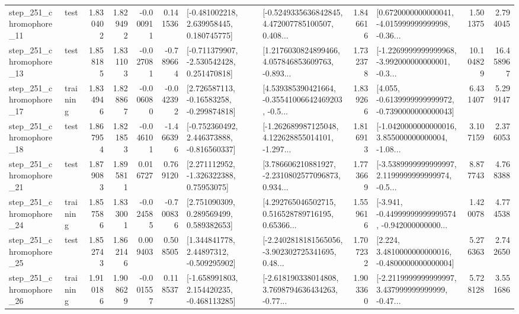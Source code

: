 \begin{tabular}{llrrrrllrlrr}
  step\_251\_chromophore\_11 &      test &      1.830402 &    1.829492 &     -0.000911 &  0.141536 &    [-0.481002218, 2.639958445, 0.180745775] &  [-0.5249335636842845, 4.472007785100507, 0.408... &       1.846616 &  [0.6720000000000041, -4.015999999999998, -0.36... &            1.501375 &          2.794045 \\
  step\_251\_chromophore\_13 &      test &      1.858185 &    1.831103 &     -0.027081 & -0.789664 &   [-0.711379907, -2.530542428, 0.251470818] &  [1.2176030824899466, 4.057846853609763, -0.893... &       1.732378 &  [-1.2269999999999968, -3.992000000000001, -0.3... &           10.104829 &         16.458967 \\
  step\_251\_chromophore\_17 &  training &      1.834946 &    1.828867 &     -0.006080 & -0.042392 &    [2.726587113, -0.16583258, -0.299874818] &  [4.539385390421664, -0.35541006642469203, -0.5... &       1.839266 &  [4.055, -0.6139999999999972, -0.7390000000000043] &            6.431407 &          5.299147 \\
  step\_251\_chromophore\_18 &      test &      1.867954 &    1.821853 &     -0.046101 & -1.466396 &   [-0.752360492, 2.446373888, -0.816560337] &  [-1.262689987125048, 4.122628855014101, -1.297... &       1.816913 &  [-1.0420000000000016, 3.855000000000004, -1.08... &            3.107159 &          2.376053 \\
  step\_251\_chromophore\_21 &      test &      1.879083 &    1.895811 &      0.016727 &  0.769120 &     [2.271112952, -1.326322388, 0.75953075] &  [3.786606210881927, -2.2310802577096873, 0.934... &       1.773669 &  [-3.5389999999999997, 2.1199999999999974, -0.5... &            8.877743 &          4.768388 \\
  step\_251\_chromophore\_24 &  training &      1.857586 &    1.833001 &     -0.024585 & -0.700836 &     [2.751090309, 0.289569499, 0.589382653] &  [4.292765046502715, 0.516528789716195, 0.65366... &       1.559616 &  [-3.941, -0.44999999999999574, -0.942000000000... &            1.420078 &          4.774538 \\
  step\_251\_chromophore\_25 &      test &      1.852743 &    1.862146 &      0.009403 &  0.508505 &     [1.344841778, 2.44897312, -0.509295902] &  [-2.2402818181565056, -3.902302725341695, 0.48... &       1.707232 &   [2.224, 3.4810000000000016, -0.4800000000000004] &            5.276363 &          2.742650 \\
  step\_251\_chromophore\_26 &  training &      1.910186 &    1.908629 &     -0.001557 &  0.118537 &   [-1.658991803, 2.154420235, -0.468113285] &  [-2.618190338014808, 3.7698794636434263, -0.77... &       1.903360 &  [-2.2119999999999997, 3.437999999999999, -0.47... &            5.728128 &          3.551686 \\

\end{tabular}
